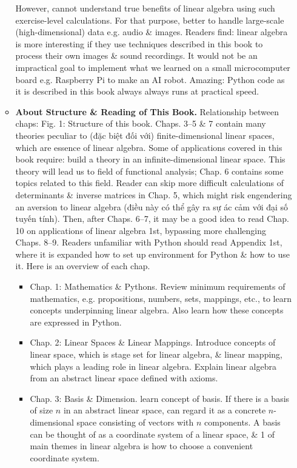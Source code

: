 \documentclass{article}
\begin{document}
\begin{itemize}
\begin{itemize}
		However, cannot understand true benefits of linear algebra using such exercise-level calculations. For that purpose, better to handle large-scale (high-dimensional) data e.g. audio \& images. Readers find: linear algebra is more interesting if they use techniques described in this book to process their own images \& sound recordings. It would not be an impractical goal to implement what we learned on a small microcomputer board e.g. Raspberry Pi to make an AI robot. Amazing: Python code as it is described in this book always always runs at practical speed.
		\item {\bf About Structure \& Reading of This Book.} Relationship between chaps: {\sf Fig. 1: Structure of this book}. Chaps. 3--5 \& 7 contain many theories peculiar to (đặc biệt đối với) finite-dimensional linear spaces, which are essence of linear algebra. Some of applications covered in this book require: build a theory in an infinite-dimensional linear space. This theory will lead us to field of functional analysis; Chap. 6 contains some topics related to this field. Reader can skip more difficult calculations of determinants \& inverse matrices in Chap. 5, which might risk engendering an aversion to linear algebra (điều này có thể gây ra sự ác cảm với đại số tuyến tính). Then, after Chaps. 6--7, it may be a good idea to read Chap. 10 on applications of linear algebra 1st, bypassing more challenging Chaps. 8--9. Readers unfamiliar with Python should read Appendix 1st, where it is expanded how to set up environment for Python \& how to use it. Here is an overview of each chap.
		\begin{itemize}
			\item {\sf Chap. 1: Mathematics \& Pythons.} Review minimum requirements of mathematics, e.g. propositions, numbers, sets, mappings, etc., to learn concepts underpinning linear algebra. Also learn how these concepts are expressed in Python.
			\item {\sf Chap. 2: Linear Spaces \& Linear Mappings.}  Introduce concepts of linear space, which is stage set for linear algebra, \& linear mapping, which plays a leading role in linear algebra. Explain linear algebra from an abstract linear space defined with axioms.
			\item {\sf Chap. 3: Basis \& Dimension.} learn concept of basis. If there is a basis of size $n$ in an abstract linear space, can regard it as a concrete $n$-dimensional space consisting of vectors with $n$ components. A basis can be thought of as a coordinate system of a linear space, \& 1 of main themes in linear algebra is how to choose a convenient coordinate system.

\end{itemize}
\end{itemize}
\end{itemize}
\end{document}
